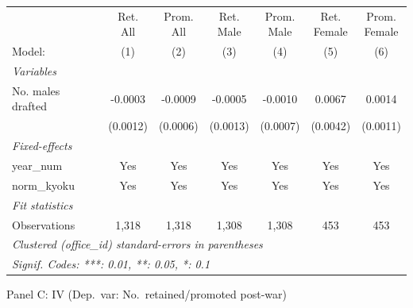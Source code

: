 \begin{table}[htbp]
\begin{threeparttable}
\begin{tabular}{lcccccc}
   \tabularnewline \midrule \midrule
                        & \makecell{Ret.\\All}    & \makecell{Prom.\\All}    & \makecell{Ret.\\Male}    & \makecell{Prom.\\Male}    & \makecell{Ret.\\Female}    & \makecell{Prom.\\Female} \\      
   Model:               & (1)                     & (2)                      & (3)                      & (4)                       & (5)                        & (6)\\  
   \midrule
   \emph{Variables}\\
   No. males drafted    & -0.0003                 & -0.0009                  & -0.0005                  & -0.0010                   & 0.0067                     & 0.0014\\   
                        & (0.0012)                & (0.0006)                 & (0.0013)                 & (0.0007)                  & (0.0042)                   & (0.0011)\\   
   \midrule
   \emph{Fixed-effects}\\
   year\_num            & Yes                     & Yes                      & Yes                      & Yes                       & Yes                        & Yes\\  
   norm\_kyoku          & Yes                     & Yes                      & Yes                      & Yes                       & Yes                        & Yes\\  
   \midrule
   \emph{Fit statistics}\\
   Observations         & 1,318                   & 1,318                    & 1,308                    & 1,308                     & 453                        & 453\\  
   \midrule \midrule
   \multicolumn{7}{l}{\emph{Clustered (office\_id) standard-errors in parentheses}}\\
   \multicolumn{7}{l}{\emph{Signif. Codes: ***: 0.01, **: 0.05, *: 0.1}}\\
\end{tabular}

\bigskip

Panel C: IV (Dep.\ var: No.\ retained/promoted post-war)
\medskip


\end{threeparttable}
\end{table}
